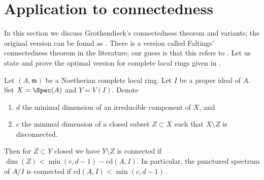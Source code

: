 \section{Application to connectedness}
\label{section-connected}

\noindent
In this section we discuss Grothendieck's connectedness theorem
and variants; the original version can be found as
\cite[Exposee XIII, Theorem 2.1]{SGA2}. There is a version
called Faltings' connectedness theorem in the literature;
our guess is that this refers to \cite[Theorem 6]{Faltings-some}.
Let us state and prove the optimal version for complete
local rings given in \cite[Theorem 1.6]{Varbaro}.

\begin{lemma}
\label{lemma-punctured-still-connected}
\begin{reference}
\cite[Theorem 1.6]{Varbaro}
\end{reference}
Let $(A, \mathfrak m)$ be a Noetherian complete local ring.
Let $I$ be a proper ideal of $A$.
Set $X = \Spec(A)$ and $Y = V(I)$.
Denote
\begin{enumerate}
\item $d$ the minimal dimension of an irreducible component of $X$, and
\item $c$ the minimal dimension of a closed subset $Z \subset X$
such that $X \setminus Z$ is disconnected.
\end{enumerate}
Then for $Z \subset Y$ closed we have $Y \setminus Z$ is connected if
$\dim(Z) < \min(c, d - 1) - \text{cd}(A, I)$. In particular, the punctured
spectrum of $A/I$ is connected if $\text{cd}(A, I) < \min(c, d - 1)$.
\end{lemma}

